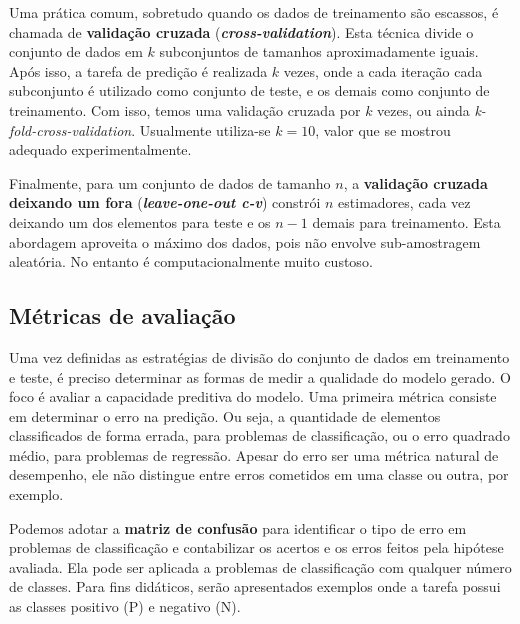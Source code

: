 Uma prática comum, sobretudo quando os dados de treinamento são escassos, é chamada de \textbf{validação cruzada} (\textit{\textbf{cross-validation}}). Esta técnica divide o conjunto de dados em $k$ subconjuntos de tamanhos aproximadamente iguais. Após isso, a tarefa de predição é realizada $k$ vezes, onde a cada iteração cada subconjunto é utilizado como conjunto de teste, e os demais como conjunto de treinamento. Com isso, temos uma validação cruzada por $k$ vezes, ou ainda \textit{k-fold-cross-validation}. Usualmente utiliza-se $k = 10$, valor que se mostrou adequado experimentalmente.

Finalmente, para um conjunto de dados de tamanho $n$, a \textbf{validação cruzada deixando um fora} (\textit{\textbf{leave-one-out c-v}}) constrói $n$ estimadores, cada vez deixando um dos elementos para teste e os $n - 1$ demais para treinamento. Esta abordagem aproveita o máximo dos dados, pois não envolve sub-amostragem aleatória. No entanto é computacionalmente muito custoso.

\subsection{Métricas de avaliação}

Uma vez definidas as estratégias de divisão do conjunto de dados em treinamento e teste, é preciso determinar as formas de medir a qualidade do modelo gerado. O foco é avaliar a capacidade preditiva do modelo. Uma primeira métrica consiste em determinar o erro na predição. Ou seja, a quantidade de elementos classificados de forma errada, para problemas de classificação, ou o erro quadrado médio, para problemas de regressão. Apesar do erro ser uma métrica natural de desempenho, ele não distingue entre erros cometidos em uma classe ou outra, por exemplo.

Podemos adotar a \textbf{matriz de confusão} para identificar o tipo de erro em problemas de classificação e contabilizar os acertos e os erros feitos pela hipótese avaliada. Ela pode ser aplicada a problemas de classificação com qualquer número de classes. Para fins didáticos, serão apresentados exemplos onde a tarefa possui as classes positivo (P) e negativo (N).

